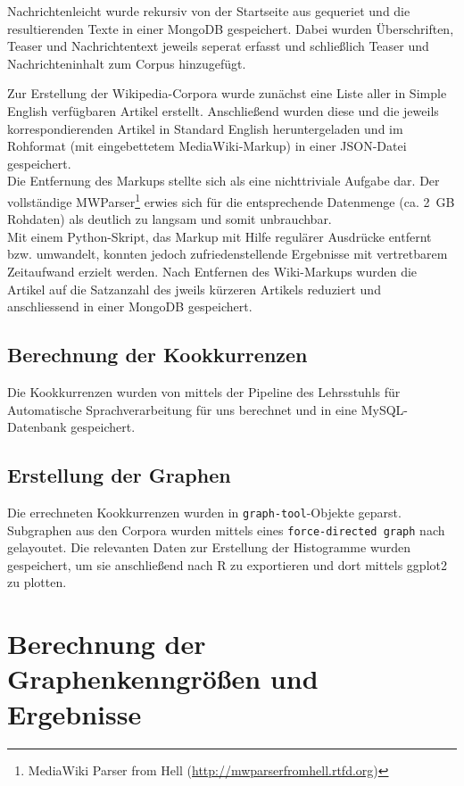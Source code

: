 \documentclass[11pt, a4paper]{article}
\begin{document}
Nachrichtenleicht wurde rekursiv von der Startseite aus gequeriet
und die resultierenden Texte in einer MongoDB gespeichert.
Dabei wurden Überschriften, Teaser und Nachrichtentext jeweils seperat erfasst
und schließlich Teaser und Nachrichteninhalt zum Corpus hinzugefügt.

Zur Erstellung der Wikipedia-Corpora wurde zunächst eine Liste aller
in Simple English verfügbaren Artikel erstellt. Anschließend wurden diese und
die jeweils korrespondierenden Artikel in Standard English heruntergeladen und
im Rohformat (mit eingebettetem MediaWiki-Markup) in einer JSON-Datei gespeichert.
\\
Die Entfernung des Markups stellte sich als eine nichttriviale Aufgabe dar.
Der vollständige MWParser\footnote{MediaWiki
Parser from Hell (\url{http://mwparserfromhell.rtfd.org})} erwies sich für die
entsprechende Datenmenge (ca. 2~GB Rohdaten) als deutlich zu langsam
und somit unbrauchbar.
\\
Mit einem Python-Skript, das Markup mit Hilfe regul\"arer Ausdr\"ucke entfernt
bzw. umwandelt, konnten jedoch zufriedenstellende Ergebnisse mit vertretbarem
Zeitaufwand erzielt werden.
Nach Entfernen des Wiki-Markups wurden die Artikel auf die Satzanzahl
des jweils k\"urzeren Artikels reduziert und anschliessend in einer MongoDB
gespeichert.


\subsection{Berechnung der Kookkurrenzen}

Die Kookkurrenzen wurden von mittels der Pipeline des Lehrsstuhls f\"ur
Automatische Sprachverarbeitung für uns berechnet und in eine MySQL-Datenbank
gespeichert.


\subsection{Erstellung der Graphen}

Die errechneten Kookkurrenzen wurden in \texttt{graph-tool}-Objekte geparst.
Subgraphen
aus den Corpora wurden mittels eines \texttt{force-directed graph} nach
\cite{Hu2006} gelayoutet.
Die relevanten Daten zur Erstellung der Histogramme wurden gespeichert,
um sie anschließend nach R zu exportieren und dort mittels ggplot2 zu plotten.


\section{Berechnung der Graphenkenngr\"o\ss{}en und Ergebnisse}
\end{document}
